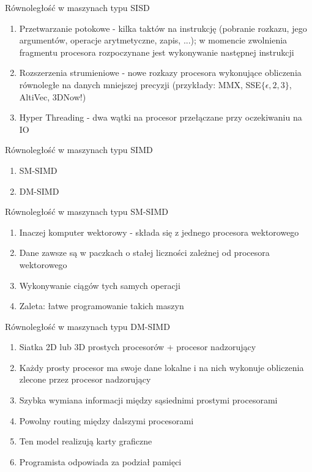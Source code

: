 \documentclass{beamer}
\begin{document}
\begin{frame}{Równoległość w maszynach typu SISD}
  \begin{enumerate}
  \item Przetwarzanie potokowe - kilka taktów na instrukcję (pobranie rozkazu, jego argumentów, operacje arytmetyczne, zapis, ...); w momencie zwolnienia fragmentu procesora rozpoczynane jest wykonywanie następnej instrukcji
  \item Rozszerzenia strumieniowe - nowe rozkazy procesora wykonujące obliczenia równoległe na danych mniejszej precyzji (przykłady: MMX, SSE$\{\epsilon,2,3\}$, AltiVec, 3DNow!)
  \item Hyper Threading - dwa wątki na procesor przełączane przy oczekiwaniu na IO
  \end{enumerate}
\end{frame}

\begin{frame}{Równoległość w maszynach typu SIMD}
  \begin{enumerate}
  \item SM-SIMD
  \item DM-SIMD
  \end{enumerate}
\end{frame}

\begin{frame}{Równoległość w maszynach typu SM-SIMD}
  \begin{enumerate}
  \item Inaczej komputer wektorowy - składa się z jednego procesora wektorowego
  \item Dane zawsze są w paczkach o stałej liczności zależnej od procesora wektorowego
  \item Wykonywanie ciągów tych samych operacji
  \item Zaleta: łatwe programowanie takich maszyn
  \end{enumerate}
\end{frame}

\begin{frame}{Równoległość w maszynach typu DM-SIMD}
  \begin{enumerate}
  \item Siatka 2D lub 3D prostych procesorów + procesor nadzorujący
  \item Każdy prosty procesor ma swoje dane lokalne i na nich wykonuje obliczenia zlecone przez procesor nadzorujący
  \item Szybka wymiana informacji między sąsiednimi prostymi procesorami
  \item Powolny routing między dalszymi procesorami
  \item Ten model realizują karty graficzne
  \item Programista odpowiada za podział pamięci
  \end{enumerate}
\end{frame}
\end{document}
